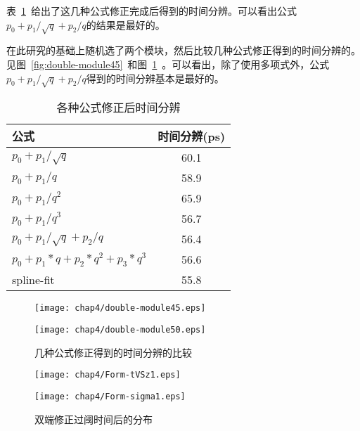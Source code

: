 表~\ref{tbl:combined-resolution}~给出了这几种公式修正完成后得到的时间分辨。可以看出公式${p_{0}+p_{1}/\sqrt{q}+p_{2}/q}$的结果是最好的。

在此研究的基础上随机选了两个模块，然后比较几种公式修正得到的时间分辨的。见图~\ref{fig:double-module45}~和图~\ref{fig:double-module50}~。可以看出，除了使用多项式外，公式${p_{0}+p_{1}/\sqrt{q}+p_{2}/q}$得到的时间分辨基本是最好的。

\begin{table}[h]
    \centering
    \caption{\label{tbl:combined-resolution} 各种公式修正后时间分辨}
  \footnotesize
    \begin{tabular}{lc}
        \hline
        公式& 时间分辨(ps) \\
        \hline
        ${p_{0}+p_{1}/\sqrt{q}}$ & 60.1 \\
        ${p_{0}+p_{1}/q}$ & 58.9 \\
        ${p_{0}+p_{1}/q^{2}}$ & 65.9 \\
        ${p_{0}+p_{1}/q^{3}}$ & 56.7 \\
        ${p_{0}+p_{1}/\sqrt{q}+p_{2}/q}$ & 56.4 \\
        ${p_{0}+p_{1}*q+p_{2}*q^{2}+p_{3}*q^3}$ & 56.6 \\
        spline-fit&   55.8 \\
        \hline
    \end{tabular}
\end{table}

\begin{figure}[!h]
\begin{minipage}[!h]{0.5\linewidth}
\texttt{[image: chap4/double-module45.eps]}
\label{fig:double-module45}
\end{minipage}%
\hfill
\begin{minipage}[!h]{0.5\linewidth}
\texttt{[image: chap4/double-module50.eps]}
\label{fig:double-module50}
\end{minipage}
\caption{几种公式修正得到的时间分辨的比较}
\end{figure}

\begin{figure}[!h]
\begin{minipage}[!h]{0.5\linewidth}
\texttt{[image: chap4/Form-tVSz1.eps]}
\label{fig:Form-tVSz1}
\end{minipage}%
\hfill
\begin{minipage}[!h]{0.5\linewidth}
\texttt{[image: chap4/Form-sigma1.eps]}
\label{fig:Form-sigma1}
\end{minipage}
\caption{双端修正过阈时间后的分布}
\end{figure}

